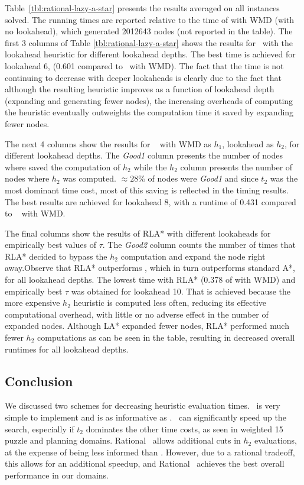 Table~\ref{tbl:rational-lazy-a-star} presents the results averaged
on all instances solved. The running times are reported relative
to the time of \astar with WMD (with no lookahead), which generated
2012643 nodes (not reported in the table). The first 3 columns of Table
\ref{tbl:rational-lazy-a-star} shows the results for \astar~with the
lookahead heuristic for different lookahead depths. The best time is
achieved for lookahead 6, (0.601 compared to \astar~with WMD). The fact
that the time is not continuing to decrease with deeper lookaheads is
clearly due to the fact that although the resulting heuristic improves
as a function of lookahead depth (expanding and generating fewer nodes),
the increasing overheads of computing the heuristic eventually outweights
the computation time it saved by expanding fewer nodes.


The next 4 columns show the results for \lazyastar~ with WMD as $h_1$,
lookahead as $h_2$, for different lookahead depths.  The {\em Good1}
column presents the number of nodes where \lazyastar saved the computation
of $h_2$ while the $h_2$ column presents the number of nodes where $h_2$
was computed. $\approx 28\%$ of nodes were {\em Good1} and since $t_2$
was the most dominant time cost, most of this saving is reflected in
the timing results.  The best results are achieved for lookahead 8,
with a runtime of 0.431 compared to \astar~ with WMD.

The final columns show the results of RLA* with different lookaheads for
empirically best values of $\tau$. The {\em Good2} column counts the
number of times that RLA* decided to bypass the $h_2$ computation and
expand the node right away.Observe that RLA* outperforms \lazyastar,
which in turn outperforms standard A*, for all lookahead depths. The
lowest time with RLA* (0.378 of \astar with WMD) and empirically best
$\tau$  was obtained for lookahead 10. That is achieved because the
more expensive $h_2$ heuristic is computed less often, reducing its
effective computational overhead, with little or no adverse effect in
the number of expanded nodes. Although LA* expanded fewer nodes, RLA*
performed much fewer $h_2$ computations as can be seen in the table,
resulting in decreased overall runtimes for all lookahead depths.

\subsection{Conclusion}

We discussed two schemes for decreasing heuristic evaluation times. \lazyastar~is very simple to implement
and is as informative as \astarmax. \lazyastar~can significantly speed up the search, especially if $t_2$ dominates
the other time costs, as seen in weighted 15 puzzle and planning domains.
Rational \lazyastar~allows additional cuts in $h_2$ evaluations, at the expense
of being less informed than \astarmax. However, due to a rational tradeoff, this
allows for an additional speedup, and Rational \lazyastar~achieves the best
overall performance in our domains.

